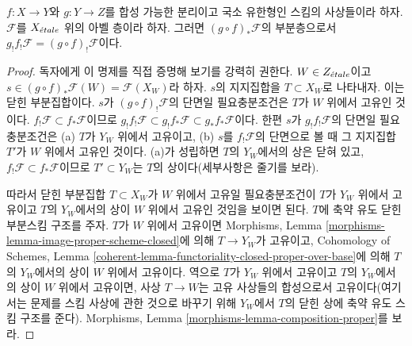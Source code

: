 \begin{lemma}
\label{lemma-f-shriek-composition}
$f : X \to Y$와 $g : Y \to Z$를 합성 가능한 분리이고 국소 유한형인
스킴의 사상들이라 하자. $\mathcal{F}$를 $X_{\acute{e}tale}$ 위의 아벨 층이라
하자. 그러면 $(g \circ f)_*\mathcal{F}$의 부분층으로서
$g_!f_!\mathcal{F} = (g \circ f)_!\mathcal{F}$이다.
\end{lemma}

\begin{proof}
독자에게 이 명제를 직접 증명해 보기를 강력히 권한다.
$W \in Z_{\acute{e}tale}$이고
$s \in (g \circ f)_*\mathcal{F}(W) = \mathcal{F}(X_W)$라 하자.
$s$의 지지집합을 $T \subset X_W$로 나타내자. 이는 닫힌 부분집합이다.
$s$가 $(g \circ f)_!\mathcal{F}$의 단면일 필요충분조건은 $T$가
$W$ 위에서 고유인 것이다.
$f_!\mathcal{F} \subset f_*\mathcal{F}$이므로
$g_!f_!\mathcal{F} \subset g_!f_*\mathcal{F} \subset
g_*f_*\mathcal{F}$이다. 한편 $s$가 $g_!f_!\mathcal{F}$의 단면일
필요충분조건은 (a) $T$가 $Y_W$ 위에서 고유이고, (b) $s$를
$f_!\mathcal{F}$의 단면으로 볼 때 그 지지집합 $T'$가 $W$ 위에서
고유인 것이다. (a)가 성립하면 $T$의 $Y_W$에서의 상은 닫혀 있고,
$f_!\mathcal{F} \subset f_*\mathcal{F}$이므로
$T' \subset Y_W$는 $T$의 상이다(세부사항은 줄기를 보라).

\medskip\noindent
따라서 닫힌 부분집합 $T \subset X_W$가 $W$ 위에서 고유일
필요충분조건이 $T$가 $Y_W$ 위에서 고유이고 $T$의 $Y_W$에서의 상이
$W$ 위에서 고유인 것임을 보이면 된다. $T$에 축약 유도 닫힌
부분스킴 구조를 주자. $T$가 $W$ 위에서 고유이면 Morphisms, Lemma
\ref{morphisms-lemma-image-proper-scheme-closed}에 의해
$T \to Y_W$가 고유이고, Cohomology of Schemes, Lemma
\ref{coherent-lemma-functoriality-closed-proper-over-base}에 의해
$T$의 $Y_W$에서의 상이 $W$ 위에서 고유이다. 역으로 $T$가
$Y_W$ 위에서 고유이고 $T$의 $Y_W$에서의 상이 $W$ 위에서
고유이면, 사상
$T \to W$는 고유 사상들의 합성으로서 고유이다(여기서는 문제를
스킴 사상에 관한 것으로 바꾸기 위해 $Y_W$에서 $T$의 닫힌 상에
축약 유도 스킴 구조를 준다). Morphisms, Lemma
\ref{morphisms-lemma-composition-proper}를 보라.
\end{proof}

